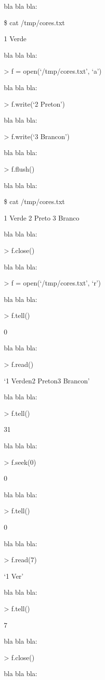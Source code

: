 \documentclass[letterpaper,10pt,brazil]{sphinxmanual}
\begin{document}
bla bla bla:

\$ cat /tmp/cores.txt

1 \sphinxhyphen{} Verde

bla bla bla:

\textgreater{} f = open(‘/tmp/cores.txt’, ‘a’)

bla bla bla:

\textgreater{} f.write(‘2 \sphinxhyphen{} Preton’)

bla bla bla:

\textgreater{} f.write(‘3 \sphinxhyphen{} Brancon’)

bla bla bla:

\textgreater{} f.flush()

bla bla bla:

\$ cat /tmp/cores.txt

1 \sphinxhyphen{} Verde
2 \sphinxhyphen{} Preto
3 \sphinxhyphen{} Branco

bla bla bla:

\textgreater{} f.close()

bla bla bla:

\textgreater{} f = open(‘/tmp/cores.txt’, ‘r’)

bla bla bla:

\textgreater{} f.tell()

0

bla bla bla:

\textgreater{} f.read()

‘1 \sphinxhyphen{} Verden2 \sphinxhyphen{} Preton3 \sphinxhyphen{} Brancon’

bla bla bla:

\textgreater{} f.tell()

31

bla bla bla:

\textgreater{} f.seek(0)

0

bla bla bla:

\textgreater{} f.tell()

0

bla bla bla:

\textgreater{} f.read(7)

‘1 \sphinxhyphen{} Ver’

bla bla bla:

\textgreater{} f.tell()

7

bla bla bla:

\textgreater{} f.close()

bla bla bla:
\end{document}
